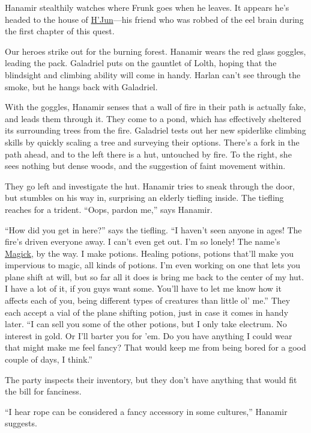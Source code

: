 \documentclass[smalldemyvopaper,11pt,twoside,onecolumn,openright,extrafontsizes]{memoir}
\begin{document}
Hanamir stealthily watches where Frunk goes when he leaves. It appears
he's headed to the house of \href{/characters/hjun/}{H'Jun}---his friend
who was robbed of the eel brain during the first chapter of this quest.

Our heroes strike out for the burning forest. Hanamir wears the red
glass goggles, leading the pack. Galadriel puts on the gauntlet of
Lolth, hoping that the blindsight and climbing ability will come in
handy. Harlan can't see through the smoke, but he hangs back with
Galadriel.

With the goggles, Hanamir senses that a wall of fire in their path is
actually fake, and leads them through it. They come to a pond, which has
effectively sheltered its surrounding trees from the fire. Galadriel
tests out her new spiderlike climbing skills by quickly scaling a tree
and surveying their options. There's a fork in the path ahead, and to
the left there is a hut, untouched by fire. To the right, she sees
nothing but dense woods, and the suggestion of faint movement within.

They go left and investigate the hut. Hanamir tries to sneak through the
door, but stumbles on his way in, surprising an elderly tiefling inside.
The tiefling reaches for a trident. ``Oops, pardon me,'' says Hanamir.

``How did you get in here?'' says the tiefling. ``I haven't seen anyone
in ages! The fire's driven everyone away. I can't even get out. I'm so
lonely! The name's \href{/characters/magick/}{Magick}, by the way. I
make potions. Healing potions, potions that'll make you impervious to
magic, all kinds of potions. I'm even working on one that lets you plane
shift at will, but so far all it does is bring me back to the center of
my hut. I have a lot of it, if you guys want some. You'll have to let me
know how it affects each of you, being different types of creatures than
little ol' me.'' They each accept a vial of the plane shifting potion,
just in case it comes in handy later. ``I can sell you some of the other
potions, but I only take electrum. No interest in gold. Or I'll barter
you for 'em. Do you have anything I could wear that might make me feel
fancy? That would keep me from being bored for a good couple of days, I
think.''

The party inspects their inventory, but they don't have anything that
would fit the bill for fanciness.

``I hear rope can be considered a fancy accessory in some cultures,''
Hanamir suggests.
\end{document}
